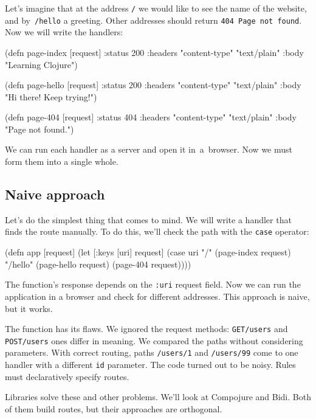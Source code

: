 
Let's imagine that at the address \verb|/| we would like to see the name of the website, and by~\verb|/hello| a greeting. Other addresses should return \verb|404 Page not found|. Now we will write the handlers:

\begin{english}
\begin{clojure}
(defn page-index [request]
{:status 200
:headers {"content-type" "text/plain"}
:body "Learning Clojure"})

(defn page-hello [request]
{:status 200
:headers {"content-type" "text/plain"}
:body "Hi there! Keep trying!"})

(defn page-404 [request]
{:status 404
:headers {"content-type" "text/plain"}
:body "Page not found."})
\end{clojure}
\end{english}

We can run each handler as a server and open it in~a~browser. Now we must form them into a single whole.

\subsection{Naive approach}

Let's do the simplest thing that comes to mind. We will write a handler that finds the route manually. To do this, we'll check the path with the \verb|case| operator:

\begin{english}
\begin{clojure}
(defn app [request]
(let [{:keys [uri]} request]
(case uri
"/"      (page-index request)
"/hello" (page-hello request)
(page-404 request))))
\end{clojure}
\end{english}

The function's response depends on the \verb|:uri| request field. Now we can run the application in a browser and check for different addresses. This approach is naive, but it works.

The function has its flaws. We ignored the request methods: \verb|GET/users| and \verb|POST/users| ones differ in meaning. We compared the paths without considering parameters. With correct routing, paths \verb|/users/1| and \verb|/users/99| come to one handler with a different \verb|id| parameter. The code turned out to be noisy. Rules must declaratively specify routes. 

Libraries solve these and other problems. We'll look at Compojure and Bidi. Both of them build routes, but their approaches are orthogonal.

